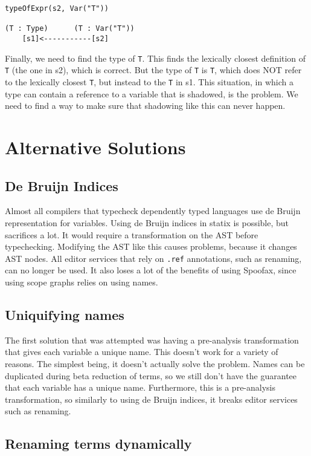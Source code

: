 \begin{lstlisting}
typeOfExpr(s2, Var("T"))

(T : Type)      (T : Var("T"))
	[s1]<-----------[s2]
\end{lstlisting}

Finally, we need to find the type of \verb|T|. This finds the lexically closest definition of \verb|T| (the one in s2), which is correct. But the type of \verb|T| is \verb|T|, which does NOT refer to the lexically closest \verb|T|, but instead to the \verb|T| in s1. This situation, in which a type can contain a reference to a variable that is shadowed, is the problem. We need to find a way to make sure that shadowing like this can never happen.

\section{Alternative Solutions}

\subsection{De Bruijn Indices}

Almost all compilers that typecheck dependently typed languages use de Bruijn representation for variables. Using de Bruijn indices in statix is possible, but sacrifices a lot. It would require a transformation on the AST before typechecking. Modifying the AST like this causes problems, because it changes AST nodes. All editor services that rely on \verb|.ref| annotations, such as renaming, can no longer be used. It also loses a lot of the benefits of using Spoofax, since using scope graphs relies on using names.

\subsection{Uniquifying names}

The first solution that was attempted was having a pre-analysis transformation that gives each variable a unique name. This doesn't work for a variety of reasons. The simplest being, it doesn't actually solve the problem. Names can be duplicated during beta reduction of terms, so we still don't have the guarantee that each variable has a unique name. Furthermore, this is a pre-analysis transformation, so similarly to using de Bruijn indices, it breaks editor services such as renaming.

\subsection{Renaming terms dynamically}

